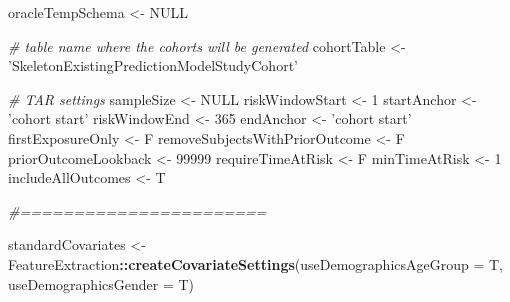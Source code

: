 \documentclass[
]{article}
\newenvironment{Shaded}{\begin{snugshade}}{\end{snugshade}}
\newcommand{\CommentTok}[1]{\textcolor[rgb]{0.56,0.35,0.01}{\textit{#1}}}
\newcommand{\DataTypeTok}[1]{\textcolor[rgb]{0.13,0.29,0.53}{#1}}
\newcommand{\DecValTok}[1]{\textcolor[rgb]{0.00,0.00,0.81}{#1}}
\newcommand{\KeywordTok}[1]{\textcolor[rgb]{0.13,0.29,0.53}{\textbf{#1}}}
\newcommand{\NormalTok}[1]{#1}
\newcommand{\OperatorTok}[1]{\textcolor[rgb]{0.81,0.36,0.00}{\textbf{#1}}}
\newcommand{\OtherTok}[1]{\textcolor[rgb]{0.56,0.35,0.01}{#1}}
\newcommand{\StringTok}[1]{\textcolor[rgb]{0.31,0.60,0.02}{#1}}
\begin{document}
\begin{Shaded}
\begin{Highlighting}[]
\NormalTok{  oracleTempSchema <-}\StringTok{ }\OtherTok{NULL}
  
  \CommentTok{# table name where the cohorts will be generated}
\NormalTok{  cohortTable <-}\StringTok{ 'SkeletonExistingPredictionModelStudyCohort'}
  
  \CommentTok{# TAR settings}
\NormalTok{  sampleSize <-}\StringTok{ }\OtherTok{NULL}
\NormalTok{  riskWindowStart <-}\StringTok{ }\DecValTok{1}
\NormalTok{  startAnchor <-}\StringTok{ 'cohort start'}
\NormalTok{  riskWindowEnd <-}\StringTok{ }\DecValTok{365}
\NormalTok{  endAnchor <-}\StringTok{ 'cohort start'}
\NormalTok{  firstExposureOnly <-}\StringTok{ }\NormalTok{F}
\NormalTok{  removeSubjectsWithPriorOutcome <-}\StringTok{ }\NormalTok{F}
\NormalTok{  priorOutcomeLookback <-}\StringTok{ }\DecValTok{99999}
\NormalTok{  requireTimeAtRisk <-}\StringTok{ }\NormalTok{F}
\NormalTok{  minTimeAtRisk <-}\StringTok{ }\DecValTok{1}
\NormalTok{  includeAllOutcomes <-}\StringTok{ }\NormalTok{T}
  
  
  \CommentTok{#=======================}
  
\NormalTok{  standardCovariates <-}\StringTok{ }\NormalTok{FeatureExtraction}\OperatorTok{::}\KeywordTok{createCovariateSettings}\NormalTok{(}\DataTypeTok{useDemographicsAgeGroup =}\NormalTok{ T, }\DataTypeTok{useDemographicsGender =}\NormalTok{ T)}
  

\end{Highlighting}
\end{Shaded}
\end{document}
